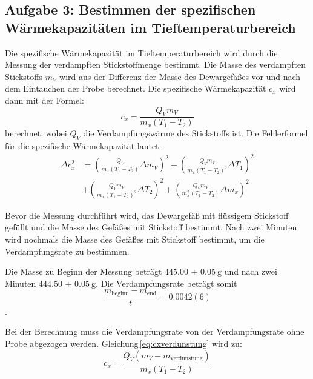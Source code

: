 \documentclass[12pt,a4paper,titlepage]{scrartcl}
\numberwithin{equation}{section}
\numberwithin{table}{section}
\numberwithin{figure}{section}
\begin{document}
\subsection{Aufgabe 3: Bestimmen der spezifischen Wärmekapazitäten im Tieftemperaturbereich}
Die spezifische Wärmekapazität im Tieftemperaturbereich wird durch die Messung der verdampften Stickstoffmenge bestimmt. Die Masse des verdampften Stickstoffs $m_V$ wird aus der Differenz der Masse des Dewargefäßes vor und nach dem Eintauchen der Probe berechnet. Die spezifische Wärmekapazität $c_x$ wird dann mit der Formel:
\begin{equation}
c_x = \frac{Q_V m_V}{m_x (T_1 - T_2)}\label{eq:cxverdunstung}
\end{equation}
berechnet, wobei $Q_V$ die Verdampfungswärme des Stickstoffs ist. Die Fehlerformel für die spezifische Wärmekapazität lautet:
\begin{equation}
    \begin{aligned}
    \Delta c_x^2 &= \left(\frac{Q_V}{m_x (T_1 - T_2)} \Delta m_V\right)^2 + \left(\frac{Q_V m_V}{m_x (T_1 - T_2)^2} \Delta T_1\right)^2 \\
     &+ \left(\frac{Q_V m_V}{m_x (T_1 - T_2)^2} \Delta T_2\right)^2 + \left(\frac{Q_V m_V}{m_x^2 (T_1 - T_2)} \Delta m_x\right)^2
    \end{aligned}
\end{equation}  

Bevor die Messung durchführt wird, das Dewargefäß mit flüssigem Stickstoff gefüllt und die Masse des Gefäßes mit Stickstoff bestimmt. Nach zwei Minuten wird nochmals die Masse des Gefäßes mit Stickstoff bestimmt, um die Verdampfungsrate zu bestimmen. 

Die Masse zu Beginn der Messung beträgt $\qty{445.00(5)}{\gram}$ und nach zwei Minuten $\qty{444.50(5)}{\gram}$. Die Verdampfungsrate beträgt somit
\begin{equation}
    \frac{m_\text{beginn} - m_\text{end}}{t} = 0.0042(6)
\end{equation}.

Bei der Berechnung muss die Verdampfungsrate von der Verdampfungsrate ohne Probe abgezogen werden. Gleichung\,\ref{eq:cxverdunstung} wird zu:
\begin{equation}
    c_x = \frac{Q_V (m_V - m_\text{verdunstung})}{m_x (T_1 - T_2)}
\end{equation}
\end{document}
